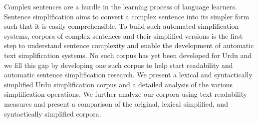 Complex sentences are a hurdle in the learning process of language learners. Sentence simplification aims to convert a complex sentence into its simpler form such that it is easily comprehensible. To build such automated simplification systems, corpora of complex sentences and their simplified versions is the first step to understand sentence complexity and enable the development of automatic text simplification systems. No such corpus has yet been developed for Urdu and we fill this gap by developing one such corpus to help start readability and automatic sentence simplification research. We present a lexical and syntactically simplified Urdu simplification corpus and a detailed analysis of the various simplification operations. We further analyze our corpora using text readability measures and present a comparison of the original, lexical simplified, and syntactically simplified corpora.
